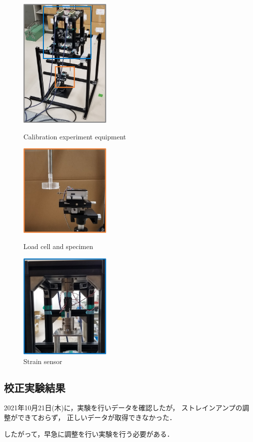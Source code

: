 \documentclass[twocolumn,a4j]{jsarticle}
\begin{document}
\begin{figure}[htbp]
    \footnotesize
    \begin{center}
        \includegraphics[width=45mm]{../images/image_05.png}
        \caption{Calibration experiment equipment}
        \includegraphics[width=45mm]{../images/image_06.png}
        \caption{Load cell and specimen}
        \includegraphics[width=45mm]{../images/image_07.png}
        \caption{Strain sensor}
    \end{center}
\end{figure}

\newpage

\subsection{校正実験結果}

2021年10月21日(木)に，実験を行いデータを確認したが，
ストレインアンプの調整ができておらず，
正しいデータが取得できなかった．\par
したがって，早急に調整を行い実験を行う必要がある．
\end{document}
